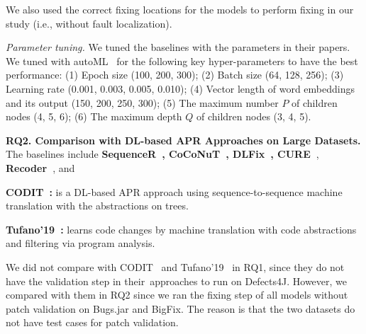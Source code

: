 
We also used the correct fixing locations for the models to perform
fixing in our study (i.e., without fault localization).



{\em Parameter tuning.} We tuned the baselines with the
parameters in their papers.
We tuned {\tool} with autoML~\cite{NNI} for the following key
hyper-parameters to have the best performance: (1) Epoch size (100,
200, 300); (2) Batch size (64, 128, 256); (3) Learning rate (0.001,
0.003, 0.005, 0.010); (4) Vector length of word embeddings and its
output (150, 200, 250, 300); (5) The maximum number $P$ of children
nodes (4, 5, 6); (6) The maximum depth $Q$ of children nodes (3, 4,
5).

\vspace{2pt} {\bf RQ2. Comparison with DL-based APR Approaches on
  Large Datasets.} The baselines include {\bf
  Sequen\-ceR~\cite{chen2018sequencer},
  CoCoNuT~\cite{lutellier2020coconut}, DLFix~\cite{icse20},
  CURE~\cite{cure-icse21}}, {\bf Recoder~\cite{recoder-fse21}}, and

{\bf CODIT~\cite{chakrabortycodit}:} is a DL-based APR approach
using sequence-to-sequence machine translation with the
abstractions on trees.

{\bf Tufano'19~\cite{tufano2019learning}:} learns code changes by
machine translation with code abstractions and
filtering via program analysis.

We did not compare with CODIT~\cite{chakrabortycodit} and
Tufano'19~\cite{tufano2019learning} in RQ1, since they do not have
the validation step in their~approaches to run on Defects4J.
%
However, we compared {\tool} with them in RQ2 since we ran the fixing
step of all models without patch validation on Bugs.jar and
BigFix. The reason is that the two datasets do not have test cases for
patch validation.


